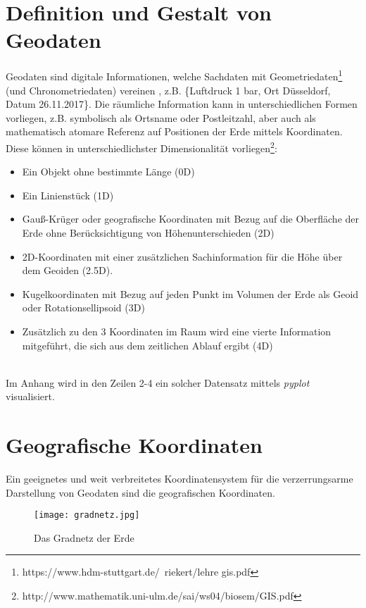 \documentclass[11pt,ceqn]{book}
\begin{document}
\section{Definition und Gestalt von Geodaten}
Geodaten sind digitale Informationen, welche Sachdaten mit Geometriedaten\footnote{https://www.hdm-stuttgart.de/~riekert/lehre gis.pdf} (und Chronometriedaten) vereinen , z.B. \{Luftdruck 1 bar, Ort Düsseldorf, Datum 26.11.2017\}. 
Die räumliche Information kann in unterschiedlichen Formen vorliegen, z.B. symbolisch als Ortsname oder Postleitzahl, aber auch als mathematisch atomare Referenz auf Positionen der Erde mittels Koordinaten. Diese können in unterschiedlichster Dimensionalität vorliegen\footnote{http://www.mathematik.uni-ulm.de/sai/ws04/biosem/GIS.pdf}:
\begin{itemize}
\item Ein Objekt ohne bestimmte Länge (0D)
\item Ein Linienstück (1D)
\item
Gauß-Krüger oder geografische Koordinaten mit Bezug auf die Oberfläche der Erde ohne Berücksichtigung von Höhenunterschieden (2D)
\item 
2D-Koordinaten mit einer zusätzlichen Sachinformation für die Höhe über dem Geoiden (2.5D).
\item Kugelkoordinaten mit Bezug auf jeden Punkt im Volumen der Erde als
Geoid oder Rotationsellipsoid (3D)
\item 
Zusätzlich zu den 3 Koordinaten im Raum wird eine vierte
Information mitgeführt, die sich aus dem zeitlichen Ablauf ergibt (4D)
\end{itemize}
~\\
Im Anhang wird in den Zeilen 2-4 ein solcher Datensatz mittels \textit{pyplot} visualisiert.

\newpage

\section{Geografische Koordinaten}
Ein geeignetes und weit verbreitetes Koordinatensystem für die verzerrungsarme Darstellung von Geodaten sind die geografischen Koordinaten. 

\begin{figure}[H]
\centering
\texttt{[image: gradnetz.jpg]}
\caption{Das Gradnetz der Erde}\label{gradnetz}
\end{figure}
\end{document}
